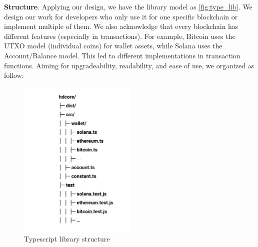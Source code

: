 \bigskip
{\textbf{Structure}}. Applying our design, we have the library model as \autoref{fig:type_lib}.
We design our work for developers who only use it for one specific blockchain or implement multiple of them. We also acknowledge that every blockchain has different features (especially in transactions). For example, Bitcoin uses the UTXO model (individual coins) for wallet assets, while Solana uses the Account/Balance model. This led to different implementations in transaction functions. Aiming for upgradeability, readability, and ease of use, we organized as follow:

\begin{figure}[ht!]
    \centering
    \includegraphics[width=0.5\textwidth]{images/lib_typescript.png}
    \caption[Typescript library structure]{Typescript library structure}
    \label{fig:type_lib}
\end{figure}

